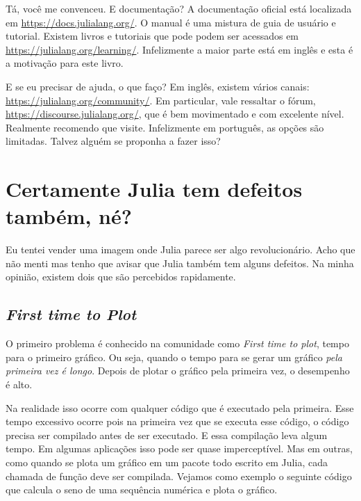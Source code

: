 \documentclass[
  notoc %
]{tufte-book}
\begin{document}
Tá, você me convenceu. E documentação? A documentação oficial está
localizada em \url{https://docs.julialang.org/}. O manual é uma mistura
de guia de usuário e tutorial. Existem livros e tutoriais que pode podem
ser acessados em \url{https://julialang.org/learning/}. Infelizmente a
maior parte está em inglês e esta é a motivação para este livro.

E se eu precisar de ajuda, o que faço? Em inglês, existem vários canais:
\url{https://julialang.org/community/}. Em particular, vale ressaltar o
fórum, \url{https://discourse.julialang.org/}, que é bem movimentado e
com excelente nível. Realmente recomendo que visite. Infelizmente em
português, as opções são limitadas. Talvez alguém se proponha a fazer
isso?

\hypertarget{certamente-julia-tem-defeitos-tambuxe9m-nuxe9}{%
\section{Certamente Julia tem defeitos também,
né?}\label{certamente-julia-tem-defeitos-tambuxe9m-nuxe9}}

Eu tentei vender uma imagem onde Julia parece ser algo revolucionário.
Acho que não menti mas tenho que avisar que Julia também tem alguns
defeitos. Na minha opinião, existem dois que são percebidos rapidamente.

\hypertarget{first-time-to-plot}{%
\subsection{\texorpdfstring{\emph{First time to
Plot}}{First time to Plot}}\label{first-time-to-plot}}

O primeiro problema é conhecido na comunidade como \emph{First time to
plot}, tempo para o primeiro gráfico. Ou seja, quando o tempo para se
gerar um gráfico \emph{pela primeira vez é longo}. Depois de plotar o
gráfico pela primeira vez, o desempenho é alto.

Na realidade isso ocorre com qualquer código que é executado pela
primeira. Esse tempo excessivo ocorre pois na primeira vez que se
executa esse código, o código precisa ser compilado antes de ser
executado. E essa compilação leva algum tempo. Em algumas aplicações
isso pode ser quase imperceptível. Mas em outras, como quando se plota
um gráfico em um pacote todo escrito em Julia, cada chamada de função
deve ser compilada. Vejamos como exemplo o seguinte código que calcula o
seno de uma sequência numérica e plota o gráfico.
\end{document}
